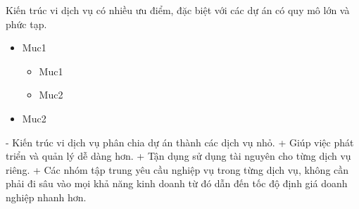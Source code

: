 Kiến trúc vi dịch vụ có nhiều ưu điểm, đặc biệt với các dự án có quy mô lớn và phức tạp.







\begin{itemize}
    \item Muc1


          \begin{itemize}
              \item Muc1
              \item Muc2
          \end{itemize}


    \item Muc2
\end{itemize}






- Kiến trúc vi dịch vụ phân chia dự án thành các dịch vụ nhỏ.
+ Giúp việc phát triển và quản lý dễ dàng hơn.
+ Tận dụng sử dụng tài nguyên cho từng dịch vụ riêng.
+ Các nhóm tập trung yêu cầu nghiệp vụ trong từng dịch vụ,  không cần phải đi sâu vào mọi khả năng kinh doanh từ đó    dẫn đến tốc độ định giá doanh nghiệp nhanh hơn.














